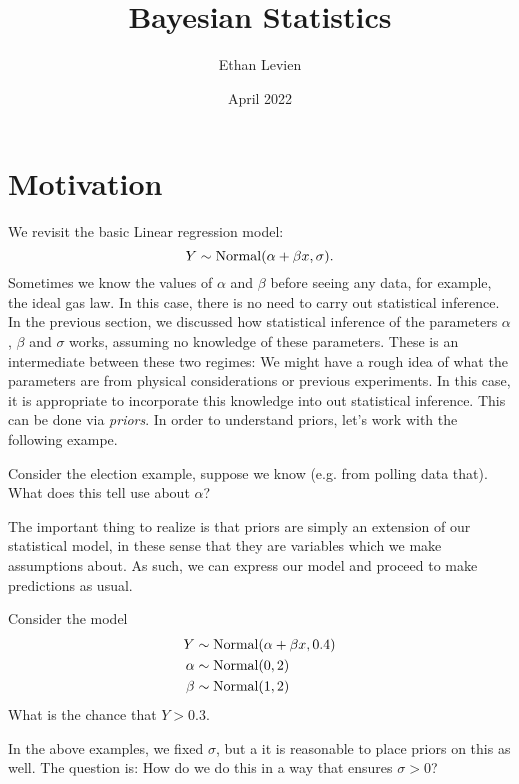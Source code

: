 

\title{\Huge \color{C1}  Bayesian Statistics}
\author{Ethan Levien}
\date{April 2022}



\maketitle

\tableofcontents





\section{Motivation}
We revisit the basic Linear regression model:
\begin{equation}
Y \sim {\rm Normal}(\alpha + \beta x,\sigma).
\end{equation} 
Sometimes we know the values of $\alpha$ and $\beta$ before seeing any data, for example, the ideal gas law. In this case, there is no need to carry out statistical inference. In the previous section, we discussed how statistical inference of the parameters $\alpha$, $\beta$ and $\sigma$ works, assuming no knowledge of these parameters. These is an intermediate between these two regimes: We might have a rough idea of what the parameters are from physical considerations or previous experiments. In this case, it is appropriate to incorporate this knowledge into out statistical inference. This can be done via \emph{priors}. In order to understand priors, let's work with the following exampe. 

\begin{exercise} Consider the election example, suppose we know (e.g. from polling data that). What does this tell use about $\alpha$? 
\end{exercise}

The important thing to realize is that priors are simply an extension of our statistical model, in these sense that they are variables which we make assumptions about. As such, we can express our model and proceed to make predictions as usual.

\begin{exercise}
Consider the model 
\begin{align}
Y &\sim {\rm Normal}(\alpha + \beta x,0.4)\\
\alpha &\sim {\rm Normal}(0,2)\\
\beta &\sim {\rm Normal}(1,2)
\end{align}
What is the chance that $Y>0.3$.
\end{exercise}
In the above examples, we fixed $\sigma$, but a it is reasonable to place priors on this as well. The question is: How do we do this in a way that ensures $\sigma>0$? 

